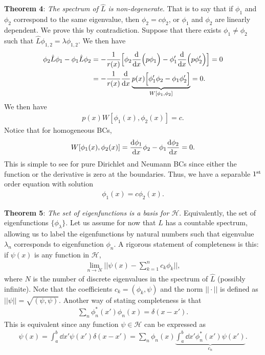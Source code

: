 \textbf{Theorem 4}: \textit{The spectrum of $\hat{L}$ is non-degenerate}.
That is to say that if $\phi_1$ and $\phi_2$ correspond to the same eigenvalue, then $\phi_2 = c \phi_2$, or $\phi_1$ and $\phi_2$ are linearly dependent.
We prove this by contradiction.
Suppose that there exists $\phi_1 \ne \phi_2$ such that $\hat{L} \phi_{1,2} = \lambda \phi_{1,2}$.
We then have
\begin{align}
    \phi_2 \hat{L} \phi_1 - \phi_1 \hat{L} \phi_2 &=  -\frac{1}{r(x)} \Big[ \phi_2 \dv{x} \Big( p \phi_1 \Big) - \phi_1' \dv{x} \Big( p \phi_2' \Big) \Big] = 0 \nonumber \\
                                                  &= -\frac{1}{r(x)} \dv{x} \underbrace{ p(x) \Big[ \phi_1' \phi_2 - \phi_1 \phi_2' \Big] }_{W[\phi_1,\phi_2]} = 0
.\end{align}
We then have 
\begin{eqnarray}
    p(x) W[\phi_1(x),\phi_2(x)] = c
.\end{eqnarray}
Notice that for homogeneous BCs,
\begin{eqnarray}
    W[\phi_1(x),\phi_2(x)] = \dv{\phi_1}{x} \phi_2 - \phi_1 \dv{\phi_2}{x} = 0
.\end{eqnarray}
This is simple to see for pure Dirichlet and Neumann BCs since either the function or the derivative is zero at the boundaries.
Thus, we have a separable $1^{\rm st}$ order equation with solution
\begin{eqnarray}
    \phi_1(x) = c\phi_2(x)
.\end{eqnarray}

\textbf{Theorem 5}: \textit{The set of eigenfunctions is a basis for $\mathcal{H}$}.
Equivalently, the set of eigenfunctions $\{ \phi_{\lambda} \} $.
Let us assume for now that $\hat{L}$ has a countable spectrum, allowing us to label the eigenfunctions by natural numbers such that eigenvalue $\lambda_{n}$ corresponds to eigenfunction $\phi_{n}$.
A rigorous statement of completeness is this: if $\psi(x)$ is any function in $\mathcal{H}$,
\begin{eqnarray}
    \lim_{n \rightarrow N} || \psi(x) - \sum_{k=1}^{n} c_{k} \phi_{k} ||
,\end{eqnarray}
where $N$ is the number of discrete eigenvalues in the spectrum of $\hat{L}$ (possibly infinite).
Note that the coefficients $c_{k} = (\phi_{k},\psi)$ and the norm $|| \cdot ||$ is defined as $|| \psi || = \sqrt{(\psi,\psi)}$.
Another way of stating completeness is that
\begin{eqnarray}
    \sum_{n} \phi_{n}^{*}(x') \phi_{n}(x) = \delta(x - x')
.\end{eqnarray}
This is equivalent since any function $\psi \in \mathcal{H}$ can be expressed as
\begin{eqnarray}
\psi(x) = \int_{a}^{b} \dd{x'} \psi(x') \delta(x - x') = \sum_{n} \phi_{n}(x) \underbrace{ \int_{a}^{b} \dd{x'} \phi_{n}^{*}(x') \psi(x') }_{c_{n}}
.\end{eqnarray}

